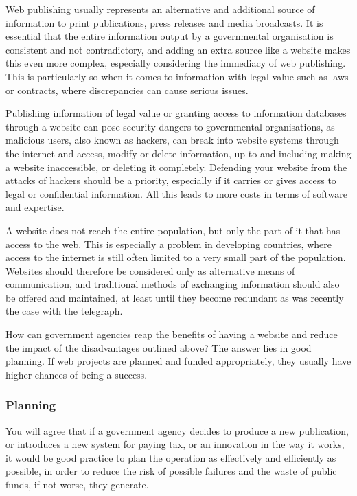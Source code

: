 Web publishing usually represents an alternative and additional source of information to print publications, press releases and media broadcasts. It is essential that the entire information output by a governmental organisation is consistent and not contradictory, and adding an extra source like a website makes this even more complex, especially considering the immediacy of web publishing. This is particularly so when it comes to information with legal value such as laws or contracts, where discrepancies can cause serious issues.

Publishing information of legal value or granting access to information databases through a website can pose security dangers to governmental organisations, as malicious users, also known as hackers, can break into website systems through the internet and access, modify or delete information, up to and including making a website inaccessible, or deleting it completely. Defending your website from the attacks of hackers should be a priority, especially if it carries or gives access to legal or confidential information. All this leads to more costs in terms of software and expertise.

A website does not reach the entire population, but only the part of it that has access to the web. This is especially a problem in developing countries, where access to the internet is still often limited to a very small part of the population. Websites should therefore be considered only as alternative means of communication, and traditional methods of exchanging information should also be offered and maintained, at least until they become redundant as was recently the case with the telegraph.

How can government agencies reap the benefits of having a website and reduce the impact of the disadvantages outlined above? The answer lies in good planning. If web projects are planned and funded appropriately, they usually have higher chances of being a success.

\subsubsection{Planning}
You will agree that if a government agency decides to produce a new publication, or introduces a new system for paying tax, or an innovation in the way it works, it would be good practice to plan the operation as effectively and efficiently as possible, in order to reduce the risk of possible failures and the waste of public funds, if not worse, they generate.


